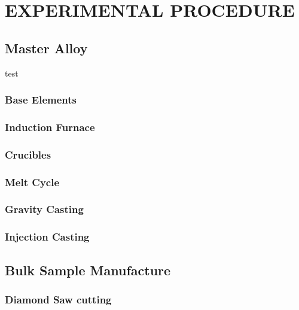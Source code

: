 \documentclass[a4paper,12pt,oneside]{report}%
\begin{document}

\tableofcontents\newpage
{}
\let\cleardoublepage\clearpage


\chapter{EXPERIMENTAL PROCEDURE}

\section{Master Alloy}
 test
\subsection{Base Elements}

\subsection{Induction Furnace}

\subsection{Crucibles}

\subsection{Melt Cycle}

\subsection{Gravity Casting}

\subsection{Injection Casting}

\section{Bulk Sample Manufacture}

\subsection{Diamond Saw cutting}
\end{document}
